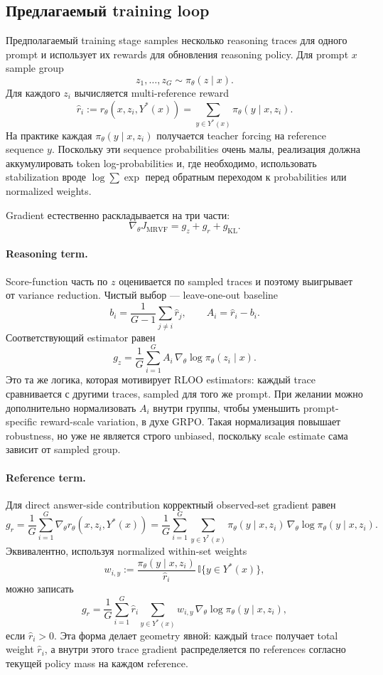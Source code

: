 \subsection{Предлагаемый training loop}

Предполагаемый training stage samples несколько reasoning traces для одного prompt и использует их rewards для обновления reasoning policy. Для prompt \(x\) sample group
\[
    z_1,\dots,z_G \sim \pi_{\theta}(z\mid x).
\]
Для каждого \(z_i\) вычисляется multi-reference reward
\[
    \hat r_i
    :=
    r_{\theta}(x,z_i,Y^{*}(x))
    =
    \sum_{y\in Y^{*}(x)}
    \pi_{\theta}(y\mid x,z_i).
\]
На практике каждая \(\pi_{\theta}(y\mid x,z_i)\) получается teacher forcing на reference sequence \(y\). Поскольку эти sequence probabilities очень малы, реализация должна аккумулировать token log-probabilities и, где необходимо, использовать stabilization вроде \(\log\sum\exp\) перед обратным переходом к probabilities или normalized weights.

Gradient естественно раскладывается на три части:
\[
    \nabla_{\theta}J_{\mathrm{MRVF}}
    =
    g_{z}+g_{r}+g_{\mathrm{KL}}.
\]

\paragraph{Reasoning term.}
Score-function часть по \(z\) оценивается по sampled traces и поэтому выигрывает от variance reduction. Чистый выбор --- leave-one-out baseline
\[
    b_i
    =
    \frac{1}{G-1}\sum_{j\neq i}\hat r_j,
    \qquad
    A_i=\hat r_i-b_i.
\]
Соответствующий estimator равен
\[
    g_{z}
    =
    \frac{1}{G}\sum_{i=1}^{G}
    A_i\,\nabla_{\theta}\log\pi_{\theta}(z_i\mid x).
\]
Это та же логика, которая мотивирует RLOO estimators: каждый trace сравнивается с другими traces, sampled для того же prompt. При желании можно дополнительно нормализовать \(A_i\) внутри группы, чтобы уменьшить prompt-specific reward-scale variation, в духе GRPO. Такая нормализация повышает robustness, но уже не является строго unbiased, поскольку scale estimate сама зависит от sampled group.

\paragraph{Reference term.}
Для direct answer-side contribution корректный observed-set gradient равен
\[
    g_{r}
    =
    \frac{1}{G}\sum_{i=1}^{G}
    \nabla_{\theta}r_{\theta}(x,z_i,Y^{*}(x))
    =
    \frac{1}{G}\sum_{i=1}^{G}
    \sum_{y\in Y^{*}(x)}
    \pi_{\theta}(y\mid x,z_i)\,
    \nabla_{\theta}\log\pi_{\theta}(y\mid x,z_i).
\]
Эквивалентно, используя normalized within-set weights
\[
    w_{i,y}
    :=
    \frac{\pi_{\theta}(y\mid x,z_i)}
    {\hat r_i}
    \,\mathbb{I}\{y\in Y^{*}(x)\},
\]
можно записать
\[
    g_{r}
    =
    \frac{1}{G}\sum_{i=1}^{G}
    \hat r_i
    \sum_{y\in Y^{*}(x)}
    w_{i,y}\,
    \nabla_{\theta}\log\pi_{\theta}(y\mid x,z_i),
\]
если \(\hat r_i>0\). Эта форма делает geometry явной: каждый trace получает total weight \(\hat r_i\), а внутри этого trace gradient распределяется по references согласно текущей policy mass на каждом reference.

